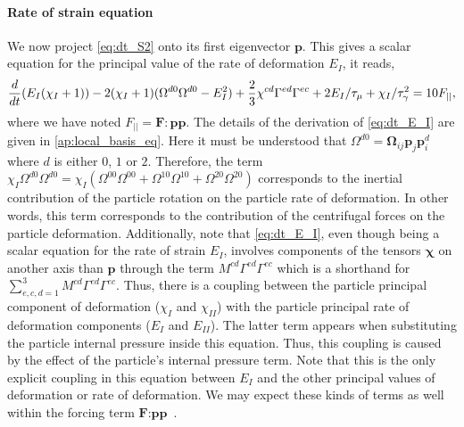 \paragraph*{Rate of strain equation}
We now project \ref{eq:dt_S2} onto its first eigenvector $\textbf{p}$.
This gives a scalar equation for the principal value of the rate of deformation $E_I$, it reads, 
\begin{equation}
        \ddt (E_I (\chi_I+1))
        - 2(\chi_I+1)( \Omega^{d0} \Omega^{d0}  - E_I^2) 
        + \frac{2}{3} \chi^{cd}
        \Gamma^{ed}\Gamma^{ec}
    + 2 E_I / \tau_\mu
    +  \chi_I /\tau_\gamma^2
    = 10 F_{||},
    \label{eq:dt_E_I}
\end{equation} 
where we have noted $F_{||} = \textbf{F}: \textbf{pp}$.
The details of the derivation of \ref{eq:dt_E_I} are given in \ref{ap:local_basis_eq}. 
Here it must be understood that $\Omega^{d0}  = \bm\Omega_{ij} \textbf{p}_j \textbf{p}^{d}_i $ where $d$ is either $0$, $1$ or $2$. 
Therefore, the term $\chi_I \Omega^{d0} \Omega^{d0} =\chi_I (\Omega^{00} \Omega^{00} + \Omega^{10} \Omega^{10} +\Omega^{20} \Omega^{20} ) $ corresponds to the inertial contribution of the particle rotation on the particle rate of deformation. 
In other words, this term corresponds to the contribution of the centrifugal forces on the particle deformation. 
Additionally, note that \ref{eq:dt_E_I}, even though being a scalar equation for the rate of strain $E_I$, involves components of the tensors $\bm\chi$ on another axis than $\textbf{p}$ through the term $M^{cd}\Gamma^{ed}\Gamma^{ec}$ which is a shorthand for $\sum_{e,c,d=1}^3 M^{cd}\Gamma^{ed}\Gamma^{ec}$. 
Thus, there is a coupling between the particle principal component of deformation ($\chi_I$ and $\chi_{II}$) with the particle principal rate of deformation components ($E_I$ and $E_{II}$).
The latter term appears when substituting the particle internal pressure inside this equation. 
Thus, this coupling is caused by the effect of the particle's internal pressure term. 
Note that this is the only explicit coupling in this equation between $E_I$ and the other principal values of deformation or rate of deformation. 
We may expect these kinds of terms as well within the forcing term $\textbf{F}:\textbf{pp}$ . 


